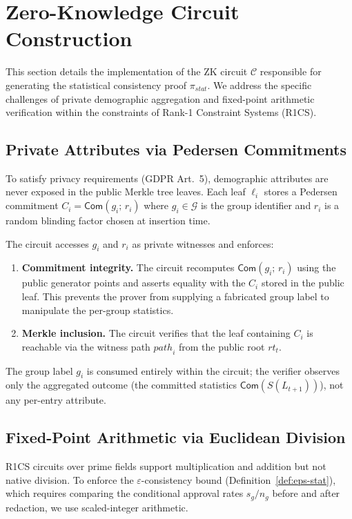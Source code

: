 \section{Zero-Knowledge Circuit Construction}
\label{sec:zk}

This section details the implementation of the ZK circuit $\mathcal{C}$
responsible for generating the statistical consistency proof
$\pi_{\mathit{stat}}$. We address the specific challenges of private
demographic aggregation and fixed-point arithmetic verification within the
constraints of Rank-1 Constraint Systems (R1CS).

\subsection{Private Attributes via Pedersen Commitments}
\label{subsec:pedersen}

To satisfy privacy requirements (GDPR Art.~5), demographic attributes are
never exposed in the public Merkle tree leaves. Each leaf $\ell_i$ stores a
Pedersen commitment $C_i = \mathsf{Com}(g_i;\, r_i)$ where $g_i \in
\mathcal{G}$ is the group identifier and $r_i$ is a random blinding factor
chosen at insertion time.

The circuit accesses $g_i$ and $r_i$ as private witnesses and enforces:
\begin{enumerate}
  \item \textbf{Commitment integrity.} The circuit recomputes
  $\mathsf{Com}(g_i;\, r_i)$ using the public generator points and asserts
  equality with the $C_i$ stored in the public leaf. This prevents the
  prover from supplying a fabricated group label to manipulate the
  per-group statistics.
  \item \textbf{Merkle inclusion.} The circuit verifies that the leaf
  containing $C_i$ is reachable via the witness path $\mathit{path}_i$
  from the public root $\mathit{rt}_t$.
\end{enumerate}

\noindent The group label $g_i$ is consumed entirely within the circuit;
the verifier observes only the aggregated outcome (the committed statistics
$\mathsf{Com}(S(L_{t+1}))$), not any per-entry attribute.

\subsection{Fixed-Point Arithmetic via Euclidean Division}
\label{subsec:fixedpoint}

R1CS circuits over prime fields support multiplication and addition but not
native division. To enforce the $\varepsilon$-consistency bound
(Definition~\ref{def:eps-stat}), which requires comparing the conditional
approval rates $s_g / n_g$ before and after redaction, we use scaled-integer
arithmetic.

